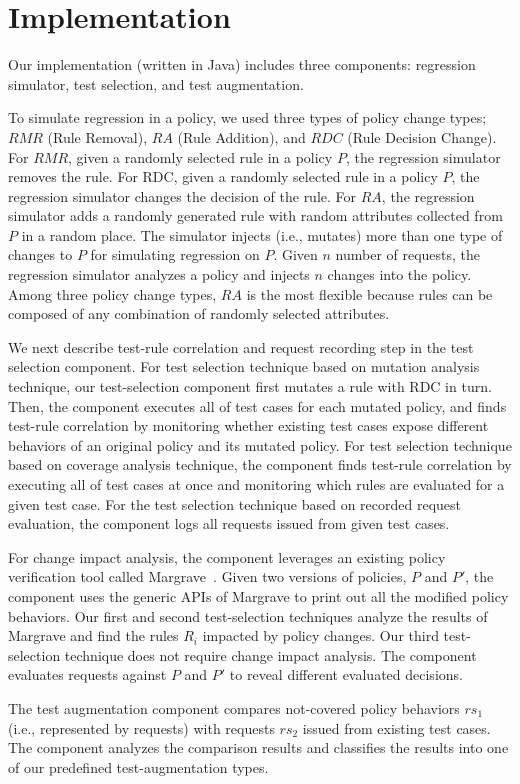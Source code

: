 \section{Implementation} \label{sec:implementation}

Our implementation (written in Java) includes three components: regression simulator, test selection,
and test augmentation.

To simulate regression in a policy, 
we used three types of policy change types; $RMR$ (Rule Removal), $RA$ (Rule Addition), and $RDC$ (Rule Decision Change). For $RMR$, given a randomly selected rule in a policy $P$,
the regression simulator removes the rule. For RDC,
given a randomly selected rule in a policy $P$, the regression simulator changes
the decision of the rule.
For $RA$, the regression simulator adds a randomly generated
rule with random attributes collected from $P$ in a random place.
The simulator injects (i.e., mutates) more than one type of changes to $P$ for simulating
regression on $P$.
Given $n$ number of requests, the regression simulator analyzes a policy and injects $n$ changes
into the policy. Among three policy change types, $RA$ is the most flexible
because rules can be composed of any combination of randomly selected attributes.

We next describe test-rule correlation and request recording step in the test selection
component. 
For test selection technique based on mutation analysis technique,
our test-selection component first mutates a rule with RDC in turn. 
Then, the component executes all of test cases for each mutated policy, and
finds test-rule correlation by monitoring 
whether existing test cases expose different behaviors of an original policy and its mutated policy.
For test selection technique based on coverage analysis technique,
the component finds test-rule correlation by executing all of test cases at once and monitoring
which rules are evaluated for a given test case. For the test selection technique based on recorded request evaluation,
the component logs all requests issued from given test cases.

For change impact analysis, the component leverages an existing policy verification tool called Margrave~\cite{fisler05:verification}. 
Given two versions of policies, $P$ and $P'$, 
the component uses the generic APIs of Margrave to
print out all the modified policy behaviors.
Our first and second test-selection techniques analyze the results of Margrave and
find the rules $R_i$ impacted by policy changes.
Our third test-selection technique does not require change impact analysis. The
component evaluates requests against $P$ and $P'$ to reveal different evaluated decisions.

The test augmentation component compares
not-covered policy behaviors $rs_1$ (i.e., represented by requests) with requests $rs_2$ issued
from existing test cases. The component analyzes the comparison results and classifies
the results into one of our predefined test-augmentation types. 
 



